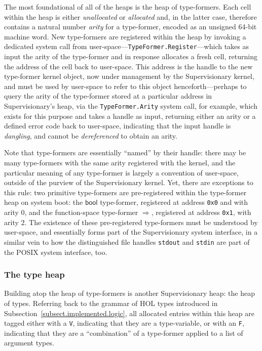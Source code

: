 \documentclass[a4paper, UKenglish, cleveref, autoref, thm-restate]{lipics-v2021}
\begin{document}
The most foundational of all of the heaps is the heap of type-formers.
Each cell within the heap is either \emph{unallocated} or \emph{allocated} and, in the latter case, therefore contains a natural number \emph{arity} for a type-former, encoded as an unsigned 64-bit machine word.
New type-formers are registered within the heap by invoking a dedicated system call from user-space---\texttt{TypeFormer.Register}---which takes as input the arity of the type-former and in response allocates a fresh cell, returning the address of the cell back to user-space.
This address is the handle to the new type-former kernel object, now under management by the Supervisionary kernel, and must be used by user-space to refer to this object henceforth---perhaps to query the arity of the type-former stored at a particular address in Supervisionary's heap, via the \texttt{TypeFormer.Arity} system call, for example, which exists for this purpose and takes a handle as input, returning either an arity or a defined error code back to user-space, indicating that the input handle is \emph{dangling}, and cannot be \emph{dereferenced} to obtain an arity.

Note that type-formers are essentially ``named'' by their handle: there may be many type-formers with the same arity registered with the kernel, and the particular meaning of any type-former is largely a convention of user-space, outside of the purview of the Supervisionary kernel.
Yet, there are exceptions to this rule: two primitive type-formers are pre-registered within the type-former heap on system boot: the $\mathsf{bool}$ type-former, registered at address \texttt{0x0} and with arity $0$, and the function-space type-former $\Rightarrow$, registered at address \texttt{0x1}, with arity $2$.
The existence of these pre-registered type-formers must be understood by user-space, and essentially forms part of the Supervisionary system interface, in a similar vein to how the distinguished file handles \texttt{stdout} and \texttt{stdin} are part of the POSIX system interface, too.

\subsubsection*{The type heap}

Building atop the heap of type-formers is another Supervisionary heap: the heap of types.
Referring back to the grammar of HOL types introduced in Subsection~\ref{subsect.implemented.logic}, all allocated entries within this heap are tagged either with a \texttt{V}, indicating that they are a type-variable, or with an \texttt{F}, indicating that they are a ``combination'' of a type-former applied to a list of argument types.
\end{document}
